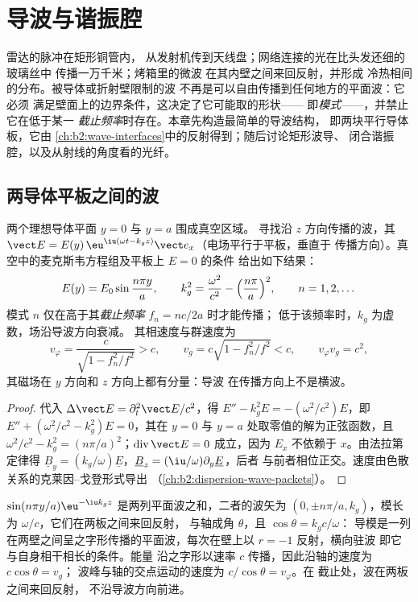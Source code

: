 \chapter{导波与谐振腔}\label{ch:b2:guided-waves}

雷达的脉冲在矩形铜管内，
从发射机传到天线盘；网络连接的光在比头发还细的玻璃丝中
传播一万千米；烤箱里的微波
在其内壁之间来回反射，并形成
冷热相间的分布。被导体或折射壁限制的波
不再是可以自由传播到任何地方的平面波：它必须
满足壁面上的边界条件，这决定了它可能取的形状——
即\emph{模式}——，并禁止它在低于某一
\emph{截止频率}时存在。本章先构造最简单的导波结构，
即两块平行导体板，它由
\cref{ch:b2:wave-interfaces}中的反射得到；随后讨论矩形波导、
闭合谐振腔，以及从射线的角度看的光纤。

\section{两导体平板之间的波}

\begin{proposition}[平行板导波的模式]\label{prop:b2:guided-waves:plates}
两个理想导体平面 $y = 0$ 与 $y = a$ 围成真空区域。
寻找沿 $z$ 方向传播的波，其 $\vect E = E(y)\,\eu^{\iu(\omega t - k_gz)}
\vect e_x$（电场平行于平板，垂直于
传播方向）。真空中的麦克斯韦方程组及平板上 $E = 0$ 的条件
给出如下结果：
\[
E(y) = E_0\sin\frac{n\pi y}a , \qquad
k_g^2 = \frac{\omega^2}{c^2} - \Bigl(\frac{n\pi}a\Bigr)^2 , \qquad n = 1, 2, \dots
\]
模式 $n$ 仅在高于其\emph{截止频率} $f_n = nc/2a$ 时才能传播；
低于该频率时，$k_g$ 为虚数，场沿导波方向衰减。
其相速度与群速度为
\[
v_\varphi = \frac c{\sqrt{1 - f_n^2/f^2}} > c , \qquad
v_g = c\sqrt{1 - f_n^2/f^2} < c , \qquad v_\varphi v_g = c^2 ,
\]
其磁场在 $y$ 方向和 $z$ 方向上都有分量：导波
在传播方向上不是横波。
\end{proposition}

\begin{proof}
代入 $\Delta\vect E = \partial_t^2\vect E/c^2$，得 $E'' - k_g^2E = -(\omega^2/c^2)E$，即
$E'' + (\omega^2/c^2 - k_g^2)E = 0$，其在 $y = 0$ 与
$y = a$ 处取零值的解为正弦函数，且 $\omega^2/c^2 - k_g^2 = (n\pi/a)^2$；$\operatorname{div}
\vect E = 0$ 成立，因为 $E_x$ 不依赖于 $x$。由法拉第定律得
$\underline B_y = (k_g/\omega)\underline E$，$\underline B_z = (\iu/\omega)\partial_y\underline E$，后者
与前者相位正交。速度由色散关系的克莱因–戈登形式导出
（\cref{ch:b2:dispersion-wave-packets}）。
\end{proof}

\begin{remark}[作为两列平面波的模式]\label{rem:b2:guided-waves:zigzag}
$\sin(n\pi y/a)\eu^{-\iu k_gz}$ 是两列平面波之和，二者的波矢为
$(0, \pm n\pi/a, k_g)$，模长为 $\omega/c$，它们在两板之间来回反射，
与轴成角 $\theta$，且 $\cos\theta = k_gc/\omega$：
导模是一列在两壁之间呈之字形传播的平面波，每次在壁上以
$r = -1$ 反射，横向驻波
即它与自身相干相长的条件。能量
沿之字形以速率 $c$ 传播，因此沿轴的速度为 $c\cos\theta = v_g$；
波峰与轴的交点运动的速度为 $c/\cos\theta = v_\varphi$。在
截止处，波在两板之间来回反射，
不沿导波方向前进。
\end{remark}

